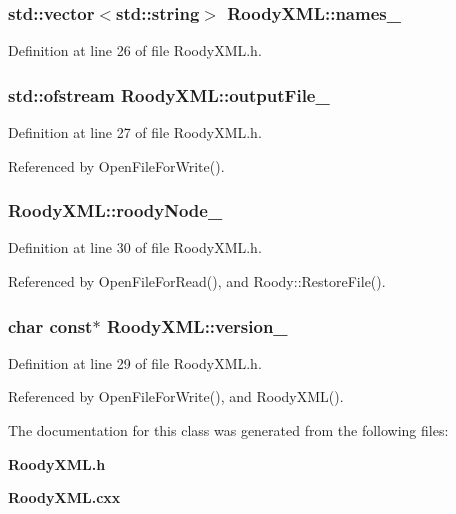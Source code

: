 \subsubsection[{names\_\-}]{\setlength{\rightskip}{0pt plus 5cm}std::vector$<$std::string$>$ {\bf RoodyXML::names\_\-}}\label{classRoodyXML_ad40dc30eaa3b55680ab6c1df36756e7b}


Definition at line 26 of file RoodyXML.h.

\subsubsection[{outputFile\_\-}]{\setlength{\rightskip}{0pt plus 5cm}std::ofstream {\bf RoodyXML::outputFile\_\-}}\label{classRoodyXML_a5f17248290685e651b5a162162da86e2}


Definition at line 27 of file RoodyXML.h.



Referenced by OpenFileForWrite().

\subsubsection[{roodyNode\_\-}]{ {\bf RoodyXML::roodyNode\_\-}}\label{classRoodyXML_a797be69bcbaf3e591569afdb30aadf25}


Definition at line 30 of file RoodyXML.h.



Referenced by OpenFileForRead(), and Roody::RestoreFile().

\subsubsection[{version\_\-}]{\setlength{\rightskip}{0pt plus 5cm}char const$\ast$ {\bf RoodyXML::version\_\-}}\label{classRoodyXML_a1698ed1c310b3cdced139dd541c7755d}


Definition at line 29 of file RoodyXML.h.



Referenced by OpenFileForWrite(), and RoodyXML().



The documentation for this class was generated from the following files:\begin{DoxyCompactItemize}
\item 
{\bf RoodyXML.h}\item 
{\bf RoodyXML.cxx}\end{DoxyCompactItemize}
